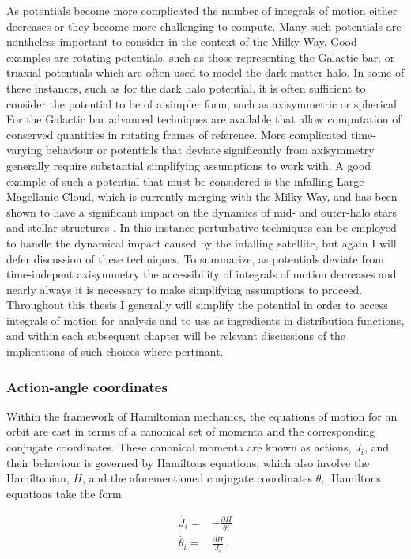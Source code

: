 As potentials become more complicated the number of integrals of motion either decreases or they become more challenging to compute. Many such potentials are nontheless important to consider in the context of the Milky Way. Good examples are rotating potentials, such as those representing the Galactic bar, or triaxial potentials which are often used to model the dark matter halo. In some of these instances, such as for the dark halo potential, it is often sufficient to consider the potential to be of a simpler form, such as axisymmetric or spherical. For the Galactic bar advanced techniques are available that allow computation of conserved quantities in rotating frames of reference. More complicated time-varying behaviour or potentials that deviate significantly from axisymmetry generally require substantial simplifying assumptions to work with. A good example of such a potential that must be considered is the infalling Large Magellanic Cloud, which is currently merging with the Milky Way, and has been shown to have a significant impact on the dynamics of mid- and outer-halo stars and stellar structures \parencite[e.g.][]{erkal19}. In this instance perturbative techniques can be employed to handle the dynamical impact caused by the infalling satellite, but again I will defer discussion of these techniques. To summarize, as potentials deviate from time-indepent axisymmetry the accessibility of integrals of motion decreases and nearly always it is necessary to make simplifying assumptions to proceed. Throughout this thesis I generally will simplify the potential in order to access integrals of motion for analysis and to use as ingredients in distribution functions, and within each subsequent chapter will be relevant discussions of the implications of such choices where pertinant.

\subsubsection{Action-angle coordinates}

Within the framework of Hamiltonian mechanics, the equations of motion for an orbit are cast in terms of a canonical set of momenta and the corresponding conjugate coordinates. These canonical momenta are known as actions, $J_{i}$, and their behaviour is governed by Hamiltons equations, which also involve the Hamiltonian, $H$, and the aforementioned conjugate coordinates $\theta_{i}$. Hamiltons equations take the form

\begin{equation}
    \label{ch1:eq:hamiltons-equations}
\begin{split}
    \dot{J_{i}}= & -\frac{\partial H}{\theta{i}} \\
    \dot{\theta_{i}} = & \frac{\partial H}{J_{i}}\,.
\end{split}
\end{equation}

